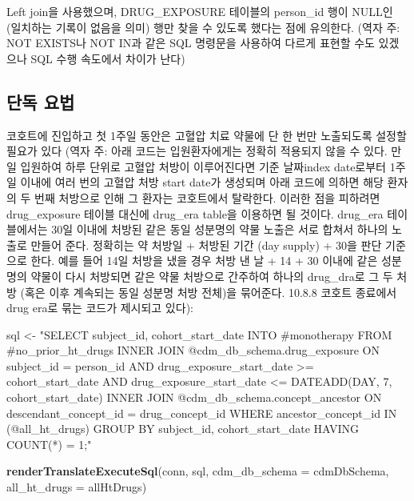 \documentclass[10.5pt]{book}
\newenvironment{Shaded}{\begin{snugshade}}{\end{snugshade}}
\newcommand{\KeywordTok}[1]{\textcolor[rgb]{0.13,0.29,0.53}{\textbf{#1}}}
\newcommand{\DataTypeTok}[1]{\textcolor[rgb]{0.13,0.29,0.53}{#1}}
\newcommand{\StringTok}[1]{\textcolor[rgb]{0.31,0.60,0.02}{#1}}
\newcommand{\NormalTok}[1]{#1}
\theoremstyle{definition}
\theoremstyle{definition}
\theoremstyle{definition}
\theoremstyle{remark}
\begin{document}
Left join을 사용했으며, DRUG\_EXPOSURE 테이블의 person\_id 행이 NULL인
(일치하는 기록이 없음을 의미) 행만 찾을 수 있도록 했다는 점에 유의한다.
(역자 주: NOT EXISTS나 NOT IN과 같은 SQL 명령문을 사용하여 다르게 표현할
수도 있겠으나 SQL 수행 속도에서 차이가 난다)

\subsection{단독 요법}\label{-}

코호트에 진입하고 첫 1주일 동안은 고혈압 치료 약물에 단 한 번만
노출되도록 설정할 필요가 있다 (역자 주: 아래 코드는 입원환자에게는
정확히 적용되지 않을 수 있다. 만일 입원하여 하루 단위로 고혈압 처방이
이루어진다면 기준 날짜index date로부터 1주일 이내에 여러 번의 고혈압
처방 start date가 생성되며 아래 코드에 의하면 해당 환자의 두 번째
처방으로 인해 그 환자는 코호트에서 탈락한다. 이러한 점을 피하려면
drug\_exposure 테이블 대신에 drug\_era table을 이용하면 될 것이다.
drug\_era 테이블에서는 30일 이내에 처방된 같은 동일 성분명의 약물 노출은
서로 합쳐서 하나의 노출로 만들어 준다. 정확히는 약 처방일 + 처방된 기간
(day supply) + 30을 판단 기준으로 한다. 예를 들어 14일 처방을 냈을 경우
처방 낸 날 + 14 + 30 이내에 같은 성분명의 약물이 다시 처방되면 같은 약물
처방으로 간주하여 하나의 drug\_dra로 그 두 처방 (혹은 이후 계속되는 동일
성분명 처방 전체)을 묶어준다. 10.8.8 코호트 종료에서 drug era로 묶는
코드가 제시되고 있다):

\begin{Shaded}
\begin{Highlighting}[]
\NormalTok{sql <-}\StringTok{ "SELECT subject_id,}
\StringTok{  cohort_start_date}
\StringTok{INTO #monotherapy}
\StringTok{FROM #no_prior_ht_drugs}
\StringTok{INNER JOIN @cdm_db_schema.drug_exposure}
\StringTok{  ON subject_id = person_id}
\StringTok{    AND drug_exposure_start_date >= cohort_start_date}
\StringTok{    AND drug_exposure_start_date <= DATEADD(DAY, 7, cohort_start_date)}
\StringTok{INNER JOIN @cdm_db_schema.concept_ancestor}
\StringTok{  ON descendant_concept_id = drug_concept_id}
\StringTok{WHERE ancestor_concept_id IN (@all_ht_drugs)}
\StringTok{GROUP BY subject_id,}
\StringTok{  cohort_start_date}
\StringTok{HAVING COUNT(*) = 1;"}

\KeywordTok{renderTranslateExecuteSql}\NormalTok{(conn,}
\NormalTok{                          sql,}
                          \DataTypeTok{cdm_db_schema =}\NormalTok{ cdmDbSchema,}
                          \DataTypeTok{all_ht_drugs =}\NormalTok{ allHtDrugs)}
\end{Highlighting}
\end{Shaded}
\end{document}
